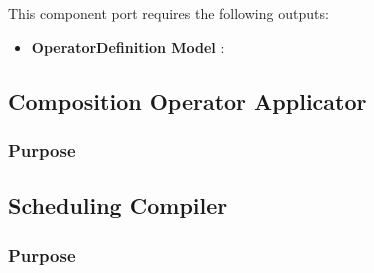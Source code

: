 \documentclass{gemoc} %
\begin{document}

This component port requires the following outputs:
\begin{itemize}
  \item \textbf{OperatorDefinition Model} :
\end{itemize}

\subsection{Composition Operator Applicator}


\subsubsection{Purpose}



\subsection{Scheduling Compiler}


\subsubsection{Purpose}

\end{document}
